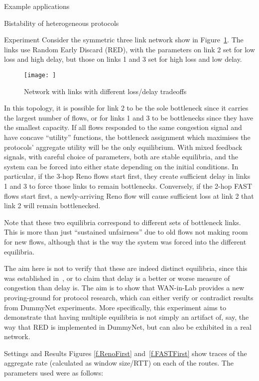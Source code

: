\documentclass{IEEEtran}
\begin{document}
\begin{section}{Example applications}
\begin{subsection}{Bistability of heterogeneous protocols}
\begin{subsubsection}{Experiment}
Consider the symmetric three link network show in Figure~\ref{f.network}.  The
links use Random Early Discard (RED), with the parameters on link 2 set for
low loss and high delay, but those on links 1 and 3 set for high loss and low
delay.

\begin{figure}
    \texttt{[image: ]}
    \caption{Network with links with different loss/delay tradeoffs}
    \label{f.network}
\end{figure}

In this topology, it is possible for link 2 to be the sole bottleneck since it
carries the largest number of flows, or for links 1 and 3 to be bottlenecks
since they have the smallest capacity.  If all flows responded to the same
congestion signal and have concave ``utility'' functions, the bottleneck
assignment which maximises the protocols' aggregate utility will be the only
equilibrium.  With mixed feedback signals, with careful choice of parameters,
both are stable equilibria, and the system can be forced into either state
depending on the initial conditions.  In particular, if the 3-hop Reno flows
start first, they create sufficient delay in links 1 and 3 to force those links
to remain bottlenecks.  Conversely, if the 2-hop FAST flows start first, a
newly-arriving Reno flow will cause sufficient loss at link 2 that link 2 will
remain bottlenecked.

Note that these two equilibria correspond to different sets of bottleneck links.
This is more than just ``sustained unfairness'' due to old flows not making
room for new flows, although that is the way the system was forced into the
different equilibria.

The aim here is not to verify that these are indeed distinct equilibria, since
this was established in~\cite{Heterogeneous}, or to claim that delay is a
better or worse measure of congestion than delay is.
The aim is to show that WAN-in-Lab provides a new proving-ground for protocol
research, which can either verify or contradict results from DummyNet
experiments.
More specifically, this experiment aims to demonstrate that having
multiple equilibria is not simply an artifact of, say, the way that RED is
implemented in DummyNet, but can also be exhibited in a real network.
\end{subsubsection}

\begin{subsubsection}{Settings and Results}
Figures \ref{f.RenoFirst} and~\ref{f.FASTFirst} show traces of the aggregate
rate (calculated as window size\slash RTT) on each of the routes.  The
parameters used were as follows:


\end{subsubsection}
\end{subsection}
\end{section}
\end{document}
